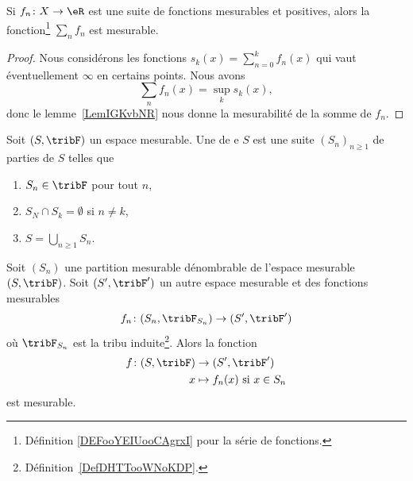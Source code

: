 \begin{proposition}\label{PropFYPEOIJ}
    Si \( f_n\colon X\to \eR\) est une suite de fonctions mesurables et positives, alors la fonction\footnote{Définition \ref{DEFooYEIUooCAgrxI} pour la série de fonctions.} \( \sum_nf_n\) est mesurable.
\end{proposition}

\begin{proof}
    Nous considérons les fonctions \( s_k(x)=\sum_{n=0}^kf_n(x)\) qui vaut éventuellement \( \infty\) en certains points. Nous avons
    \begin{equation}
        \sum_nf_n(x)=\sup_ks_k(x),
    \end{equation}
    donc le lemme~\ref{LemIGKvbNR} nous donne la mesurabilité de la somme de \( f_n\).
\end{proof}

\begin{definition}      \label{ooUDHFooJjKscR}
    Soit \( (S,\tribF)\) un espace mesurable.
    Une  de e \( S\) est une suite  \( (S_n)_{n\geq 1}\) de parties de \( S\) telles que
    \begin{enumerate}
        \item
            \( S_n\in\tribF\) pour tout \( n\),
        \item
            \( S_N\cap S_k=\emptyset\) si \( n\neq k\),
        \item
            \( S=\bigcup_{n\geq 1}S_n\).
    \end{enumerate}
\end{definition}

\begin{lemma}     \label{LEMooXAPQooPpZUmP}
    Soit \( (S_n)\) une partition mesurable dénombrable de l'espace mesurable $(S,\tribF)$. Soit \( (S',\tribF')\) un autre espace mesurable et des fonctions mesurables
    \begin{equation}
        f_n\colon (S_n,\tribF_{S_n})\to (S',\tribF')
    \end{equation}
    où \( \tribF_{S_n}\) est la tribu induite\footnote{Définition~\ref{DefDHTTooWNoKDP}.}. Alors la fonction
    \begin{equation}
        \begin{aligned}
            f\colon (S,\tribF)&\to (S',\tribF') \\
            x&\mapsto  f_n(x)\text{ si } x\in S_n
        \end{aligned}
    \end{equation}
    est mesurable.
\end{lemma}

